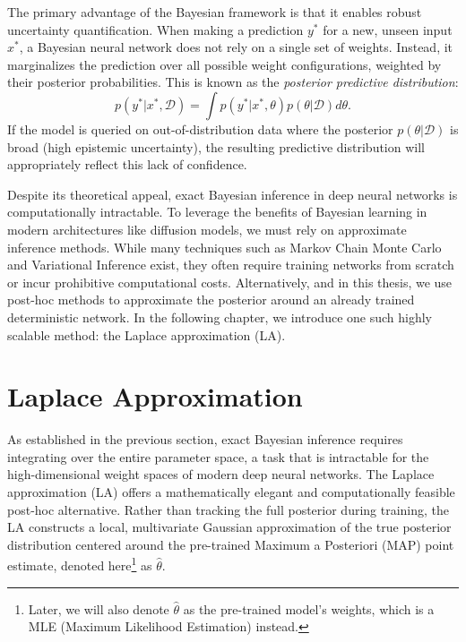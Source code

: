 The primary advantage of the Bayesian framework is that it enables robust uncertainty quantification. When making a prediction $y^*$ for a new, unseen input $x^*$, a Bayesian neural network does not rely on a single set of weights. Instead, it marginalizes the prediction over all possible weight configurations, weighted by their posterior probabilities. This is known as the \textit{posterior predictive distribution}:
\begin{equation}
    p(y^* | x^*, \mathcal{D}) = \int p(y^* | x^*, \theta) p(\theta | \mathcal{D}) d\theta.
\end{equation}
If the model is queried on out-of-distribution data where the posterior $p(\theta | \mathcal{D})$ is broad (high epistemic uncertainty), the resulting predictive distribution will appropriately reflect this lack of confidence.

Despite its theoretical appeal, exact Bayesian inference in deep neural networks is computationally intractable. 
To leverage the benefits of Bayesian learning in modern architectures like diffusion models, we must rely on approximate inference methods. 
While many techniques such as Markov Chain Monte Carlo and Variational Inference exist, they often require training networks from scratch or incur prohibitive computational costs. Alternatively, and in this thesis, we use post-hoc methods to approximate the posterior around an already trained deterministic network. In the following chapter, we introduce one such highly scalable method: the Laplace approximation (\acs{LA}).




\section{Laplace Approximation}
\label{sec:bg_laplace}

As established in the previous section, exact Bayesian inference requires integrating over the entire parameter space, a task that is intractable for the high-dimensional weight spaces of modern deep neural networks. The Laplace approximation (\acs{LA}) offers a mathematically elegant and computationally feasible post-hoc alternative. Rather than tracking the full posterior during training, the \acs{LA} constructs a local, multivariate Gaussian approximation of the true posterior distribution centered around the pre-trained Maximum a Posteriori (\acs{MAP}) point estimate, denoted here\footnote{Later, we will also denote $\hat{\theta}$ as the pre-trained model's weights, which is a \acs{MLE} (Maximum Likelihood Estimation) instead.} as $\hat{\theta}$.


